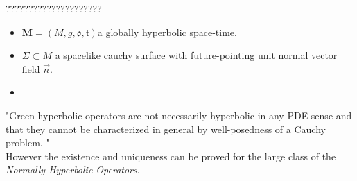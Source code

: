 \documentclass[Main]{subfiles}
\begin{document}
	?????????????????????
	\begin{proposition}
		\begin{hypothesis}
			\begin{itemize}
				\item $\mathbf{M} = (M,g,\mathfrak{o},\mathfrak{t}) $a globally hyperbolic space-time.
				\item $\Sigma \subset M$ a spacelike cauchy surface with future-pointing unit normal vector field $\vec{n}$.
				\item 
			\end{itemize}
		\end{hypothesis}
	\begin{thesis}

	\end{thesis}
	\end{proposition}
	\begin{observation}
	"Green-hyperbolic operators are not necessarily hyperbolic in any PDE-sense and that they cannot be characterized in general by well-posedness of a Cauchy problem.	" \cite{Terlaky2010} \cite{Bar2010}
	\\
	However the existence and uniqueness can be proved for the large class of the \emph{Normally-Hyperbolic Operators}.
	
	\end{observation}
\end{document}
